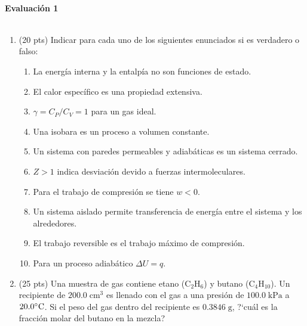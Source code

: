 \documentclass[a4paper,12pt]{article}
\begin{document}

\begin{center}
\HRule \\[0.4cm]
{ \bfseries Evaluaci\'on 1}\\ %
\HRule \\[0.4cm]
\end{center}


\begin{enumerate}

 \item (20 pts) Indicar para cada uno de los siguientes enunciados si es verdadero o falso:
 \begin{enumerate}
  \item La energ\'ia interna y la entalp\'ia no son funciones de estado.
  \item El calor espec\'ifico es una propiedad extensiva.
  \item $\gamma=C_P/C_V=1$ para un gas ideal.
  \item Una isobara es un proceso a volumen constante.
  \item Un sistema con paredes permeables y adiab\'aticas es un sistema cerrado.
  \item $Z>1$ indica desviaci\'on devido a fuerzas intermoleculares.
  \item Para el trabajo de compresi\'on se tiene $w<0$.
  \item Un sistema aislado permite transferencia de energ\'ia entre el sistema y los alrededores.
  \item El trabajo reversible es el trabajo m\'aximo de compresi\'on.
  \item Para un proceso adiab\'atico $\Delta U=q$.
 \end{enumerate}

 \item (25 pts) Una muestra de gas contiene etano ($\mbox{C}_2\mbox{H}_6$) y butano ($\mbox{C}_4\mbox{H}_{10}$). Un recipiente de $200.0\;\mbox{cm}^3$ es llenado con el gas a una presi\'on de $100.0\;\mbox{kPa}$ a $20.0\celsius$. Si el peso del gas dentro del recipiente es $0.3846\;\mbox{g}$, ?`cu\'al es la fracci\'on molar del butano en la mezcla?


\end{enumerate}
\end{document}
